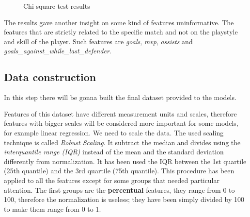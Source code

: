 \begin{figure}[H]
    \label{fig:chi_square}
    \caption{Chi square test results} 
\end{figure}

The results gave another insight on some kind of features uninformative. The features that are strictly related to the specific match and not on the playstyle and skill of the player. Such features are \textit{goals}, \textit{mvp}, \textit{assists} and \textit{goals\_against\_while\_last\_defender}.

\subsection{Data construction}

In this step there will be gonna built the final dataset provided to the models.

Features of this dataset have different measurement units and scales, therefore features with bigger scales will be considered more important for some models, for example linear regression. We need to scale the data.
The used scaling technique is called \textit{Robust Scaling}. It subtract the median and divides using the \textit{interquantile range (IQR)} instead of the mean and the standard deviation differently from normalization. It has been used the IQR between the 1st quartile (25th quantile) and the 3rd quartile (75th quantile).
This procedure has been applied to all the features except for some groups that needed particular attention.
The first groups are the \textbf{percentual} features, they range from 0 to 100, therefore the normalization is useless; they have been simply divided by 100 to make them range from 0 to 1. 

